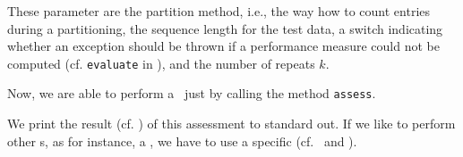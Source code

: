 These parameter are
the partition method, i.e., the way how to count entries during a partitioning,
the sequence length for the test data,
a switch indicating whether an exception should be thrown if a performance measure could not be computed (cf. \lstinline+evaluate+ in \AbstractClassifier),
and the number of repeats $k$.

Now, we are able to perform a \ClassifierAssessment~just by calling the method \lstinline+assess+.


We print the result (cf. \ListResult) of this assessment to standard out. If we like to perform other \ClassifierAssessment s, as for instance, a \RepeatedHoldOutExperiment, we have to use a specific \ParameterSet (cf. \KFoldCrossValidation~and \KFoldCrossValidationAssessParameterSet).